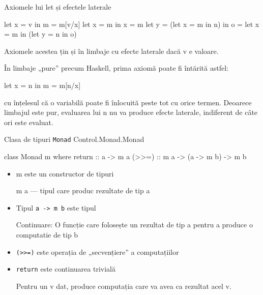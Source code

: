 \documentclass[xcolor=pdftex,romanian,colorlinks]{beamer}
\begin{document}
\begin{frame}[fragile]{Axiomele lui let și efectele laterale}
\begin{asciihs}
   let x = v in m   =   m[v/x]
   let x = m in x   =   m
   let y = (let x = m in n) in o
                    =   let x = m in (let y = n in o)
\end{asciihs}
Axiomele acestea țin și în limbaje cu efecte laterale dacă v e valoare.

În limbaje „pure” precum Haskell, prima axiomă poate fi întărită astfel:
\begin{asciihs}
   let x = n in m   =   m[n/x]
\end{asciihs}
cu înțelesul că o variabilă poate fi înlocuită peste tot cu orice termen. Deoarece limbajul este pur, evaluarea lui n nu va produce efecte laterale, indiferent de câte ori este evaluat.
\end{frame}
%


\begin{frame}[fragile]{Clasa de tipuri \lstinline$Monad$}
{Control.Monad.Monad}
\begin{asciihs}
  class Monad m where
    return :: a -> m a
    (>>=) :: m a -> (a -> m b) -> m b
\end{asciihs}
\begin{itemize}
\item m este un constructor de tipuri

m a --- tipul  care produc rezultate de tip a
\item Tipul \lstinline$a -> m b$ este tipul 

Continuare: O funcție care folosește un rezultat de tip a pentru a produce o computatie de tip b

\item \lstinline$(>>=)$ este operația de „secvențiere” a computațiilor

\item \lstinline$return$ este continuarea trivială

Pentru un v dat, produce computația care va avea ca rezultat acel v.
\end{itemize}
\end{frame}
\end{document}
